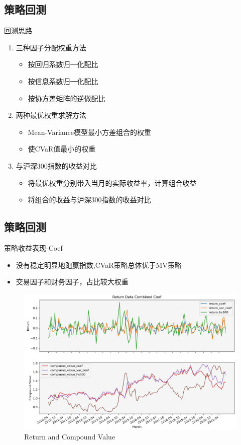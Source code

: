 \documentclass[CJK,aspectratio=43]{beamer}  %
\begin{document}
\subsection{策略回测}
\begin{frame}{回测思路}
	\begin{enumerate}
		\item 三种因子分配权重方法
		\begin{itemize}
			\item 按回归系数归一化配比
			\item 按信息系数归一化配比
			\item 按协方差矩阵的逆做配比
		\end{itemize}
		\item 两种最优权重求解方法
		\begin{itemize}
			\item Mean-Variance模型最小方差组合的权重
			\item 使CVaR值最小的权重
		\end{itemize}
		\item 与沪深300指数的收益对比
		\begin{itemize}
			\item 将最优权重分别带入当月的实际收益率，计算组合收益
			\item 将组合的收益与沪深300指数的收益对比
		\end{itemize}
	\end{enumerate}
\end{frame}

\subsection{策略回测}
\begin{frame}{策略收益表现-Coef}
	\begin{itemize}
		\item 没有稳定明显地跑赢指数,CVaR策略总体优于MV策略
		\item 交易因子和财务因子，占比较大权重
	\end{itemize}
	\begin{figure}
		\centering
		\includegraphics[width=0.85\linewidth]{pic/Coef}
		\caption{Return and Compound Value}
		\label{fig:coef}
	\end{figure}
\end{frame}
\end{document}
